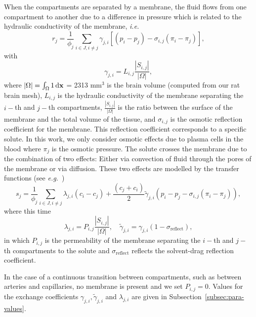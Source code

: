 \documentclass[a4paper,11pt]{article}
\newcommand{\ie}{\emph{i.e.}\;}
\newcommand{\eg}{\emph{e.g.}\;}
\newcommand{\1}{^{(1)}}
\newcommand{\2}{^{(2)}}
\newcommand*{\dd}{\mathop{\kern0pt\mathrm{d}}\!{}}
\newcommand {\f}   {\frac}
\newcommand{\abs}[1]{\left\lvert#1\right\rvert}
\newcommand {\x}   {\mathbf{x}}
\begin{document}
When the compartments are separated by a membrane, the fluid flows from one compartment to another due to a difference in pressure which is related to the hydraulic conductivity of the membrane, \ie 
\begin{equation}
    r_j = \frac{1}{\phi_j}\sum_{i\in J, i\neq j} \gamma_{j , i} \left[(p_i - p_j)-\sigma_{i,j}(\pi_i-\pi_j)\right],
\end{equation} 
with 
\begin{equation}
\gamma_{j , i} = L_{i,j} \f{\abs{S_{i,j}}}{\abs{\Omega}},
\end{equation}
where $|\Omega| = \int_\Omega 1 \dd \x$ = 2313 mm$^3$ is the brain volume (computed from our rat brain mesh), $L_{i,j}$ is the hydraulic conductivity of the membrane separating the $i-$th and $j-$th compartments, $\f{\abs{S_{i,j}}}{\abs{\Omega}}$ is the ratio between the surface of the membrane and the total volume of the tissue, and $\sigma_{i,j}$ is the osmotic reflection coefficient for the membrane. This reflection coefficient corresponds to a specific solute. In this work, we only consider osmotic effects due to plasma cells in the blood where $\pi_j$ is the osmotic pressure. 
The solute crosses the membrane due to the combination of two effects: Either via convection of fluid through the pores of the membrane or via diffusion. These two effects are modelled by the transfer functions (see \eg~\cite{jarzynska2006application})
\begin{equation}
    s_j = \frac{1}{\phi_j}  \sum_{i\in J, i\neq j}\lambda_{j , i} ( c_i- c_j) +  \frac{(c_j+c_i)}{2} \tilde \gamma_{j , i} (p_i - p_j-\sigma_{i,j}(\pi_i-\pi_j)) ,
\end{equation}
where this time 
\[
    \lambda_{j , i} = P_{i,j} \f{\abs{S_{i,j}}}{\abs{\Omega}}, \quad \tilde \gamma_{j , i} =  \gamma_{j , i} (1-\sigma_\text{reflect}),
\]
in which $P_{i,j}$ is the permeability of the membrane separating the $i-$th and $j-$th compartments to the solute and $\sigma_\text{reflect}$ reflects the solvent-drag reflection coefficient. 


In the case of a continuous transition between compartments, such as between arteries and capillaries, no membrane is present and we set $P_{i,j} = 0$. Values for the exchange coefficients $\gamma_{j , i}, \tilde \gamma_{j , i}$ and $ \lambda_{j , i}$ are given in Subsection~\ref{subsec:para-values}.
\end{document}
